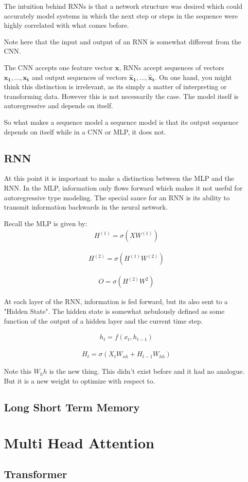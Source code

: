 \documentclass{article}
\begin{document}
The intuition behind RNNs is that a network structure was desired which could accurately model systems in which the next step or steps in the sequence were highly correlated with what comes before.

Note here that the input and output of an RNN is somewhat different from the CNN.

The CNN accepts one feature vector $\mathbf{x}$, RNNs accept sequences of vectors $\mathbf{x_1},...,\mathbf{x_t}$ and output sequences of vectors $\mathbf{\hat{x}_1},...,\mathbf{\hat{x}_t}$. On one hand, you might think this distinction is irrelevant, as its simply a matter of interpreting or transforming data. However this is not necessarily the case. The model itself is autoregressive and depends on itself.

So what makes a sequence model a sequence model is that its output sequence depends on itself while in a CNN or MLP, it does not.

\subsection{RNN}

At this point it is important to make a distinction between the MLP and the RNN. In the MLP, information only flows forward which makes it not useful for autoregressive type modeling. The special sauce for an RNN is its ability to transmit information backwards in the neural network.

Recall the MLP is given by:
\begin{align*}
H^{(1)} = \sigma(XW^{(1)}) 
\end{align*}

\begin{align*}
H^{(2)} = \sigma(H^{(1)}W^{(2)})
\end{align*}

\begin{align*}
O = \sigma(H^{(2)}W^{2}) 
\end{align*}

At each layer of the RNN, information is fed forward, but its also sent to a "Hidden State". The hidden state is somewhat nebulously defined as some function of the output of a hidden layer and the current time step.

\begin{align*}
h_{t} = f(x_t, h_{t-1})
\end{align*}

\begin{align*}
H_{t} = \sigma( X_t W_{xh} + H_{t-1} W_{hh} )
\end{align*}

Note this $W_hh$ is the new thing. This didn't exist before and it had no analogue. But it is a new weight to optimize with respect to.


\subsection*{Long Short Term Memory}

\section{Multi Head Attention}

\subsection{Transformer}
\end{document}
